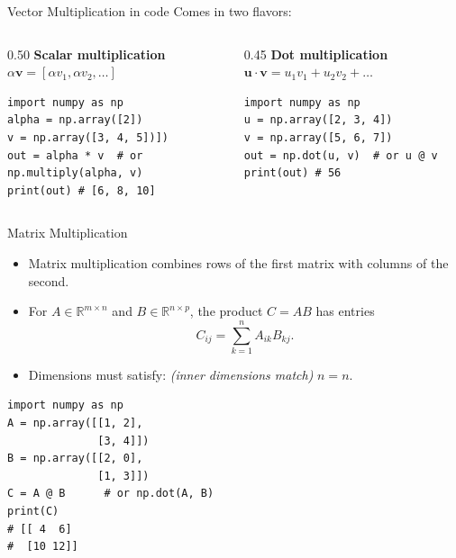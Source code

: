\documentclass{beamer}
\begin{document}
\begin{frame}[fragile]{Vector Multiplication in code}
Comes in two flavors:
 \begin{columns}[T,onlytextwidth]
      \begin{column}{0.50\textwidth}
        \textbf{Scalar multiplication} $\alpha \mathbf{v} = [\alpha v_1, \alpha v_2, \ldots]$
        \begin{verbatim}
import numpy as np
alpha = np.array([2])
v = np.array([3, 4, 5])])
out = alpha * v  # or np.multiply(alpha, v)
print(out) # [6, 8, 10]
\end{verbatim}
      \end{column}
      \begin{column}{0.45\textwidth}
        \textbf{Dot multiplication} $\mathbf{u} \cdot \mathbf{v} = u_1 v_1 + u_2 v_2 + \ldots$
        \begin{verbatim}
import numpy as np
u = np.array([2, 3, 4])
v = np.array([5, 6, 7])
out = np.dot(u, v)  # or u @ v
print(out) # 56
\end{verbatim}
      \end{column}
    \end{columns}
\end{frame}
\begin{frame}[fragile]{Matrix Multiplication}
\begin{itemize}
    \item Matrix multiplication combines rows of the first matrix with columns of the second.
    \item For $A \in \mathbb{R}^{m\times n}$ and $B \in \mathbb{R}^{n\times p}$, the product $C = AB$ has entries
    \[
        C_{ij} = \sum_{k=1}^{n} A_{ik} B_{kj}.
    \]
    \item Dimensions must satisfy: \textit{(inner dimensions match)} $n=n$.
\end{itemize}
\begin{center}
\begin{verbatim}
import numpy as np
A = np.array([[1, 2],
              [3, 4]])
B = np.array([[2, 0],
              [1, 3]])
C = A @ B      # or np.dot(A, B)
print(C)
# [[ 4  6]
#  [10 12]]
\end{verbatim}
\end{center}
\end{frame}

\end{document}
